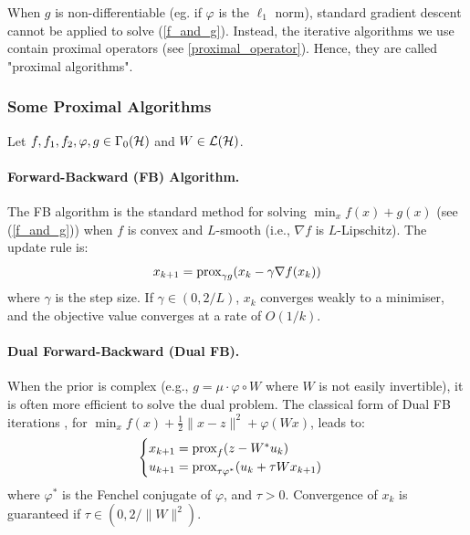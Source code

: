 \documentclass[a4paper,11pt]{article}
\newcommand{\prox}{\ensuremath{\text{\rm prox}}}
\theoremstyle{plain}{\theorembodyfont{\rmfamily}%
\newtheorem{proposition}[theorem]{Proposition}}
\theoremstyle{plain}{\theorembodyfont{\rmfamily}%
\newtheorem{notation}[theorem]{Notation}}
\theoremstyle{plain}{\theorembodyfont{\rmfamily}%
\newtheorem{assumption}[theorem]{Assumption}}
\theoremstyle{plain}{\theorembodyfont{\rmfamily}%
\newtheorem{problem}[theorem]{Problem}}
\theoremstyle{plain}{\theorembodyfont{\rmfamily}%
\newtheorem{example}[theorem]{Example}}
\theoremstyle{plain}{\theorembodyfont{\rmfamily}%
\newtheorem{remark}[theorem]{Remark}}
\theoremstyle{plain}{\theorembodyfont{\rmfamily}%
\newtheorem{definition}[theorem]{Definition}}
\theoremstyle{plain}{\theorembodyfont{\rmfamily}%
\newtheorem{question}[theorem]{Question}}
\numberwithin{equation}{section}
\begin{document}
When $g$ is non-differentiable (eg. if $\varphi$ is the $\ell_1$ norm), standard gradient descent cannot be applied to solve (\ref{f_and_g}). Instead, the iterative algorithms we use contain proximal operators (see \ref{proximal_operator}). Hence, they are called "proximal algorithms".

\subsubsection{Some Proximal Algorithms}
\label{subsubsec:prox_algos}

Let $f, f_1, f_2, \varphi, g \in \Gamma_0({\mathcal{H}})$ and $W \in {\ensuremath{\mathcal{L}}}({\mathcal{H}})$.

\paragraph{Forward-Backward (FB) Algorithm.}
The FB algorithm \cite{combettes2005signal} is the standard method for solving $\min_x f(x) + g(x)$ (see (\ref{f_and_g})) when $f$ is convex and $L$-smooth (i.e., $\nabla f$ is $L$-Lipschitz). The update rule is:
\begin{equation}
    x_{k+1} = \prox_{\gamma g} (x_k - \gamma \nabla f(x_k))
\end{equation}
where $\gamma$ is the step size. If $\gamma \in (0, 2/L)$, $x_k$ converges weakly to a minimiser, and the objective value converges at a rate of $O(1/k)$.

\paragraph{Dual Forward-Backward (Dual FB).}
When the prior is complex (e.g., $ g = \mu \cdot \varphi \circ W$ where $W$ is not easily invertible), it is often more efficient to solve the dual problem. The classical form of Dual FB iterations \cite{le2024unfolded}, for $\min_x f(x) + \frac{1}{2}\|x-z\|^2 + \varphi(Wx)$, leads to:
\begin{equation}
    \begin{cases}
    x_{k+1} = \prox_{f} (z - W^*u_{k}) \\
    u_{k+1} = \prox_{\tau \varphi^*} (u_k + \tau W x_{k+1}) \\
    \end{cases}
\end{equation}
where $\varphi^*$ is the Fenchel conjugate of $\varphi$, and $\tau > 0$. Convergence of $x_k$ is guaranteed if $\tau \in (0, 2/ \|W\|^2)$.
\end{document}
